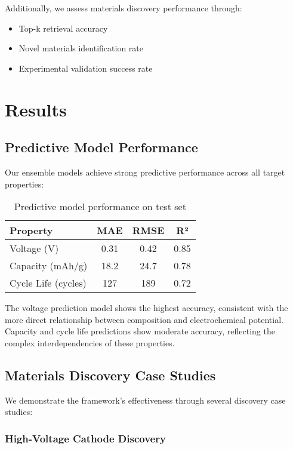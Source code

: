\documentclass{article}
\begin{document}
Additionally, we assess materials discovery performance through:
\begin{itemize}
\item Top-k retrieval accuracy
\item Novel materials identification rate
\item Experimental validation success rate
\end{itemize}

\section{Results}

\subsection{Predictive Model Performance}

Our ensemble models achieve strong predictive performance across all target properties:

\begin{table}[h]
\caption{Predictive model performance on test set}
\label{tab:performance}
\centering
\begin{tabular}{lccc}
\toprule
Property & MAE & RMSE & R² \\
\midrule
Voltage (V) & 0.31 & 0.42 & 0.85 \\
Capacity (mAh/g) & 18.2 & 24.7 & 0.78 \\
Cycle Life (cycles) & 127 & 189 & 0.72 \\
\bottomrule
\end{tabular}
\end{table}

The voltage prediction model shows the highest accuracy, consistent with the more direct relationship between composition and electrochemical potential. Capacity and cycle life predictions show moderate accuracy, reflecting the complex interdependencies of these properties.

\subsection{Materials Discovery Case Studies}

We demonstrate the framework's effectiveness through several discovery case studies:

\subsubsection{High-Voltage Cathode Discovery}
\end{document}
